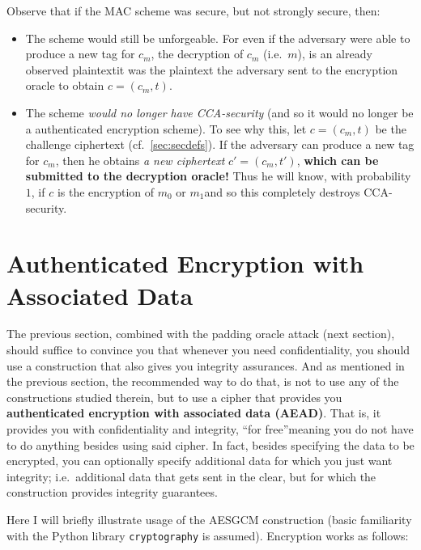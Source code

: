   Observe that if the MAC scheme was secure, but not strongly secure, then:
  \begin{itemize}
    \item The scheme would still be unforgeable. For even if the adversary were able to produce a new tag for $c_m$, the decryption of $c_m$ (i.e.\ $m$), is an already observed plaintext\emd it was the plaintext the adversary sent to the encryption oracle to obtain $c = (c_m, t)$.
    \item The scheme \emph{would no longer have CCA-security} (and so it would no longer be a authenticated encryption scheme). To see why this, let $c = (c_m, t)$ be the challenge ciphertext (cf.\ \ts\ref{sec:secdefs}). If the adversary can produce a new tag for $c_m$, then he obtains \emph{a new ciphertext} $c' = (c_m, t')$, \textbf{which can be submitted to the decryption oracle!} Thus he will know, with probability $1$, if $c$ is the encryption of $m_0$ or $m_1$\emd and so this completely destroys CCA-security.
  \end{itemize}

\section{Authenticated Encryption with Associated Data}
  \label{sec:authenc_aead}
  The previous section, combined with the padding oracle attack (next section), should suffice to convince you that whenever you need confidentiality, you should use a construction that also gives you integrity assurances. And as mentioned in the previous section, the recommended way to do that, is not to use any of the constructions studied therein, but to use a cipher that provides you \textbf{authenticated encryption with associated data (AEAD)}. That is, it provides you with confidentiality and integrity, ``for free''\emd meaning you do not have to do anything besides using said cipher. In fact, besides specifying the data to be encrypted, you can optionally specify additional data for which you just want integrity; i.e.\ additional data that gets sent in the clear, but for which the construction provides integrity guarantees.

  Here I will briefly illustrate usage of the AESGCM construction (basic familiarity with the Python library \texttt{cryptography} is assumed). Encryption works as follows:

